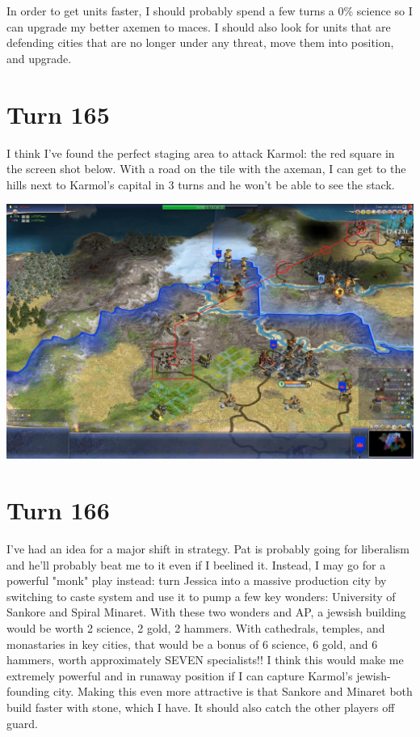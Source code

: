 \documentclass[10pt]{article}
\begin{document}
In order to get units faster, I should probably spend a few turns a
0\% science so I can upgrade my better axemen to maces. I should also
look for units that are defending cities that are no longer under any
threat, move them into position, and upgrade.

\section*{Turn 165}

I think I've found the perfect staging area to attack Karmol: the red
square in the screen shot below. With a road on the tile with the
axeman, I can get to the hills next to Karmol's capital in 3 turns and
he won't be able to see the stack.

\includegraphics[width=1.0\textwidth]{turn165}

\section*{Turn 166}

I've had an idea for a major shift in strategy. Pat is probably going
for liberalism and he'll probably beat me to it even if I beelined
it. Instead, I may go for a powerful "monk" play instead: turn Jessica
into a massive production city by switching to caste system and use it
to pump a few key wonders: University of Sankore and Spiral
Minaret. With these two wonders and AP, a jewsish building would be
worth 2 science, 2 gold, 2 hammers. With cathedrals, temples, and
monastaries in key cities, that would be a bonus of 6 science, 6 gold,
and 6 hammers, worth approximately SEVEN specialists!! I think this
would make me extremely powerful and in runaway position if I can
capture Karmol's jewish-founding city. Making this even more
attractive is that Sankore and Minaret both build faster with stone,
which I have. It should also catch the other players off guard.
\end{document}
